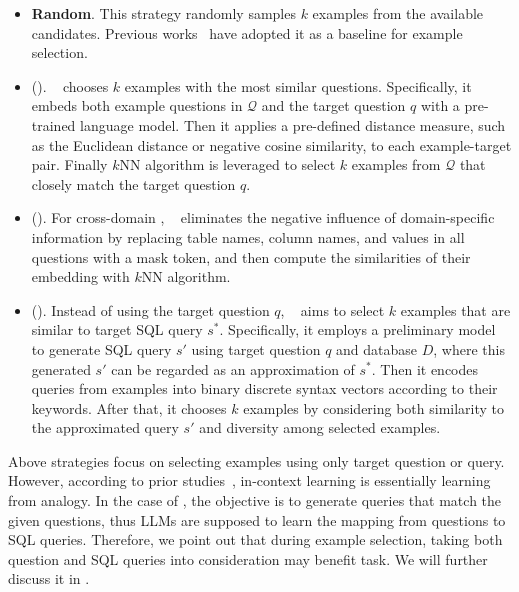 \begin{itemize}
    \item \textbf{Random}. This strategy randomly samples $k$ examples from the available candidates. Previous works~\cite{DBLP:conf/acl-deelio/LiuSZDCC22, DBLP:journals/corr/abs-2304-13301, enhancing} have adopted it as a baseline for example selection. 
    \item \textbf{\qsselector} (\abqsselector). \abqsselector~\cite{DBLP:conf/acl-deelio/LiuSZDCC22} chooses $k$ examples with the most similar questions. 
    Specifically, it embeds both example questions in $\mathcal{Q}$ and the target question $q$ with a pre-trained language model. 
    Then it applies a pre-defined distance measure, such as the Euclidean distance or negative cosine similarity, to each example-target pair. Finally $k$NN algorithm is leveraged to select $k$ examples from $\mathcal{Q}$ that closely match the target question $q$. 

    \item \textbf{\slmselector} (\abslmselector). For cross-domain \nlsql, \abslmselector~\cite{DBLP:journals/corr/abs-2304-13301} eliminates the negative influence of domain-specific information by replacing table names, column names, and values in all questions with a mask token, and then compute the similarities of their embedding with $k$NN algorithm.
    \item \textbf{\qrsselector} (\abqrsselector). Instead of using the target question $q$, 
    \abqrsselector~\cite{enhancing} aims to select $k$ examples that are similar to target SQL query $s^*$. 
    Specifically, it employs a preliminary model to generate SQL query $s'$ using target question $q$ and database $D$, where this generated $s'$ can be regarded as an approximation of $s^*$. 
    Then it encodes queries from examples into binary discrete syntax vectors according to their keywords. 
    After that, it chooses $k$ examples by considering both similarity to the approximated query $s'$ and diversity among selected examples. 
\end{itemize}

Above strategies focus on selecting examples using only target question or query. 
However, according to prior studies~\cite{icl22}, in-context learning is essentially learning from analogy. 
In the case of \nlsql, the objective is to generate queries that match the given questions, thus LLMs are supposed to learn the mapping from questions to SQL queries. 
Therefore, we point out that during example selection, taking both question and SQL queries into consideration may benefit \nlsql task. 
We will further discuss it in .

